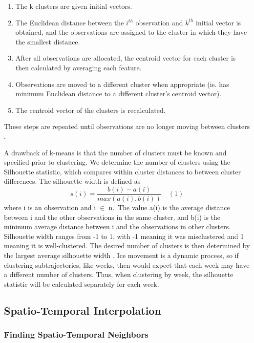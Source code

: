 \documentclass[12pt]{article}
\providecommand{\tightlist}{%
  \setlength{\itemsep}{0pt}\setlength{\parskip}{0pt}}
\begin{document}
\begin{enumerate}
\def\labelenumi{\arabic{enumi}.}
\tightlist
\item
  The k clusters are given initial vectors.
\item
  The Euclidean distance between the \(i^{th}\) observation and
  \(k^{th}\) initial vector is obtained, and the observations are
  assigned to the cluster in which they have the smallest distance.
\item
  After all observations are allocated, the centroid vector for each
  cluster is then calculated by averaging each feature.
\item
  Observations are moved to a different cluster when appropriate (ie.
  has minimum Euclidean distance to a different cluster's centroid
  vector).
\item
  The centroid vector of the clusters is recalculated.
\end{enumerate}

These steps are repeated until observations are no longer moving between
clusters \citep{steinley_kmeans_2006}.

A drawback of k-means is that the number of clusters must be known and
specified prior to clustering. We determine the number of clusters using
the Silhouette statistic, which compares within cluster distances to
between cluster differences. The silhouette width is defined as
\[s(i) = \frac{b(i) - a(i)}{max(a(i), b(i))} \quad (1)\] where i is an
observation and i \(\in\) n.~The value a(i) is the average distance
between i and the other observations in the same cluster, and b(i) is
the minimum average distance between i and the observations in other
clusters. Silhouette width ranges from -1 to 1, with -1 meaning it was
misclustered and 1 meaning it is well-clustered. The desired number of
clusters is then determined by the largest average silhouette width
\citep{kodinariya_2013}. Ice movement is a dynamic process, so if
clustering subtrajectories, like weeks, then would expect that each week
may have a different number of clusters. Thus, when clustering by week,
the silhouette statistic will be calculated separately for each week.

\hypertarget{spatio-temporal-interpolation}{%
\subsection{Spatio-Temporal
Interpolation}\label{spatio-temporal-interpolation}}

\hypertarget{finding-spatio-temporal-neighbors}{%
\subsubsection{Finding Spatio-Temporal
Neighbors}\label{finding-spatio-temporal-neighbors}}
\end{document}
